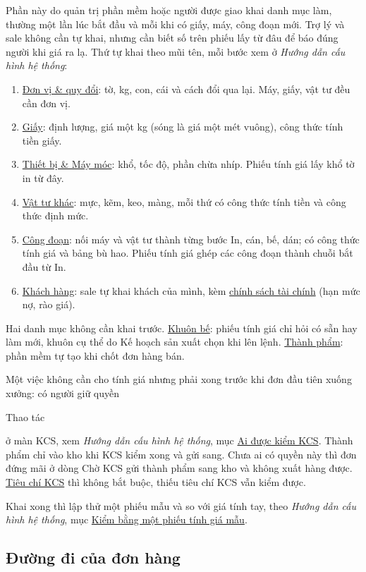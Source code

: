 \documentclass[11pt,a4paper]{article}
\newcommand{\oo}[1]{{\setlength{\fboxsep}{1.2pt}\colorbox{vang}{\strut #1}}}
\newcommand{\q}[1]{\textquotedbl#1\textquotedbl{}}
\newcommand{\tl}[1]{\textit{#1}}
\newcommand{\cauhinh}{../huong-dan-cau-hinh/cau-hinh-he-thong.pdf}
\newcommand{\kbn}[2]{\href{\cauhinh\##1}{\textcolor{lienket}{#2}}}
\newcommand{\kb}[2]{\tl{Hướng dẫn cấu hình hệ thống}, mục \kbn{#1}{#2}}
\begin{document}
Phần này do quản trị phần mềm hoặc người được giao khai danh mục làm, thường một lần lúc bắt đầu và mỗi khi có
giấy, máy, công đoạn mới. Trợ lý và sale không cần tự khai, nhưng cần biết số trên phiếu lấy từ đâu để báo đúng
người khi giá ra lạ. Thứ tự khai theo mũi tên, mỗi bước xem ở \tl{Hướng dẫn cấu hình hệ thống}:

\begin{enumerate}
\item \kbn{danh-muc-don-vi}{Đơn vị \& quy đổi}: tờ, kg, con, cái và cách đổi qua lại. Máy, giấy, vật tư đều cần
đơn vị.
\item \kbn{danh-muc-giay}{Giấy}: định lượng, giá một kg (sóng là giá một mét vuông), công thức tính tiền giấy.
\item \kbn{danh-muc-may}{Thiết bị \& Máy móc}: khổ, tốc độ, phần chừa nhíp. Phiếu tính giá lấy khổ tờ in từ đây.
\item \kbn{danh-muc-vat-tu}{Vật tư khác}: mực, kẽm, keo, màng, mỗi thứ có công thức tính tiền và công thức định
mức.
\item \kbn{danh-muc-cong-doan}{Công đoạn}: nối máy và vật tư thành từng bước In, cán, bế, dán; có công thức tính
giá và bảng bù hao. Phiếu tính giá ghép các công đoạn thành chuỗi bắt đầu từ In.
\item \kbn{kinh-doanh-khach}{Khách hàng}: sale tự khai khách của mình, kèm
\kbn{kinh-doanh-tai-chinh}{chính sách tài chính} (hạn mức nợ, rào giá).
\end{enumerate}

Hai danh mục không cần khai trước. \kbn{danh-muc-khuon}{Khuôn bế}: phiếu tính giá chỉ hỏi có sẵn hay làm mới, khuôn
cụ thể do Kế hoạch sản xuất chọn khi lên lệnh. \kbn{danh-muc-thanh-pham}{Thành phẩm}: phần mềm tự tạo khi chốt đơn
hàng bán.

Một việc không cần cho tính giá nhưng phải xong trước khi đơn đầu tiên xuống xưởng: có người giữ quyền
\oo{Thao tác} ở màn KCS, xem \kb{danh-muc-kcs-quyen}{Ai được kiểm KCS}. Thành phẩm chỉ vào kho khi KCS kiểm xong và
gửi sang. Chưa ai có quyền này thì đơn đứng mãi ở dòng \q{Chờ KCS gửi thành phẩm sang kho} và không xuất hàng
được. \kbn{danh-muc-kcs}{Tiêu chí KCS} thì không bắt buộc, thiếu tiêu chí KCS vẫn kiểm được.

Khai xong thì lập thử một phiếu mẫu và so với giá tính tay, theo \kb{kinh-doanh-kiem}{Kiểm bằng một phiếu tính giá
mẫu}.

\subsection{Đường đi của đơn hàng}\label{duong-di-don}
\end{document}
